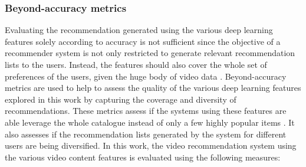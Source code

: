 \documentclass[review]{elsarticle}
\begin{document}
\subsubsection{Beyond-accuracy metrics}
Evaluating the recommendation generated using the various deep learning features solely according to accuracy is not sufficient since the objective of a recommender system is not only restricted to generate relevant recommendation lists to the users. Instead, the features should also cover the whole set of preferences of the users, given the huge body of video data \citep{silveira2019good}. Beyond-accuracy metrics are used to help to assess the quality of the various deep learning features explored in this work by capturing the coverage and diversity of recommendations. These metrics assess if the systems using these features are able leverage the whole catalogue instead of only a few highly popular items \citep{deldjoo2019movie}. It also assesses if the recommendation lists generated by the system for different users are being diversified. In this work, the video recommendation system using the various video content features is evaluated using the following measures:\\ 
\end{document}
